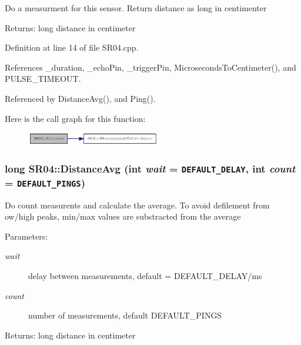 Do a measurment for this sensor. Return distance as long in centimenter \begin{Desc}
\item[Returns:]long distance in centimeter \end{Desc}


Definition at line 14 of file SR04.cpp.

References \_\-duration, \_\-echoPin, \_\-triggerPin, MicrosecondsToCentimeter(), and PULSE\_\-TIMEOUT.

Referenced by DistanceAvg(), and Ping().

Here is the call graph for this function:\nopagebreak
\begin{figure}[H]
\begin{center}
\leavevmode
\includegraphics[width=166pt]{class_s_r04_1fbb097bdcde18aa3095ddc96d41a653_cgraph}
\end{center}
\end{figure}
\hypertarget{class_s_r04_fd9284a5840d1a09c825f4255dba4b7b}{
\subsubsection[DistanceAvg]{\setlength{\rightskip}{0pt plus 5cm}long SR04::DistanceAvg (int {\em wait} = {\tt DEFAULT\_\-DELAY}, \/  int {\em count} = {\tt DEFAULT\_\-PINGS})}}
\label{class_s_r04_fd9284a5840d1a09c825f4255dba4b7b}


Do count measurents and calculate the average. To avoid defilement from ow/high peaks, min/max values are substracted from the average

\begin{Desc}
\item[Parameters:]
\begin{description}
\item[{\em wait}]delay between measurements, default = DEFAULT\_\-DELAY/ms \item[{\em count}]number of measurements, default DEFAULT\_\-PINGS \end{description}
\end{Desc}
\begin{Desc}
\item[Returns:]long distance in centimeter \end{Desc}


